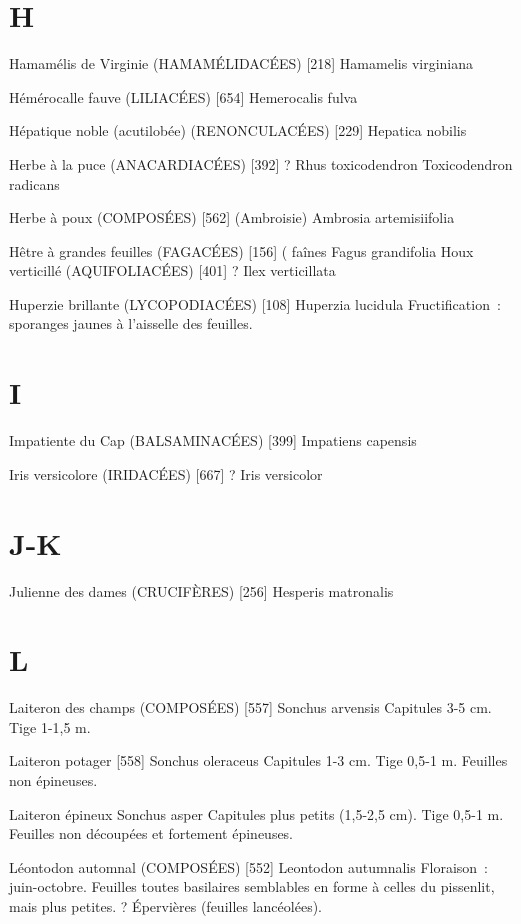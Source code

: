 \chapter*{H}

Hamamélis de Virginie (HAMAMÉLIDACÉES)  [218]
				Hamamelis virginiana

Hémérocalle fauve (LILIACÉES)  [654]
				Hemerocalis fulva

Hépatique noble (acutilobée) (RENONCULACÉES)  [229]
				Hepatica nobilis

Herbe à la puce (ANACARDIACÉES)  [392]			?
				Rhus toxicodendron
				Toxicodendron radicans

Herbe à poux (COMPOSÉES)  [562]  (Ambroisie)
				Ambrosia artemisiifolia

Hêtre à grandes feuilles (FAGACÉES)  [156]			( faînes
				Fagus grandifolia
Houx verticillé (AQUIFOLIACÉES)  [401]			?
				Ilex verticillata

Huperzie brillante (LYCOPODIACÉES)  [108]
				Huperzia lucidula
Fructification : sporanges jaunes à l’aisselle des feuilles.

\chapter*{I}

Impatiente du Cap (BALSAMINACÉES)  [399]
				Impatiens capensis

Iris versicolore (IRIDACÉES)  [667]				?
				Iris versicolor

\chapter*{J-K}

Julienne des dames (CRUCIFÈRES)  [256]
				Hesperis matronalis




\chapter*{L}

Laiteron des champs (COMPOSÉES)  [557]
				Sonchus arvensis
Capitules 3-5 cm. Tige 1-1,5 m.

Laiteron potager  [558]
				Sonchus oleraceus
Capitules 1-3 cm. Tige 0,5-1 m. Feuilles non épineuses.

Laiteron épineux
				Sonchus asper
Capitules plus petits (1,5-2,5 cm). Tige 0,5-1 m. Feuilles non découpées et fortement épineuses.

Léontodon automnal (COMPOSÉES)  [552]
				Leontodon autumnalis
Floraison : juin-octobre. Feuilles toutes basilaires semblables en forme à celles du pissenlit, mais plus petites. ? Épervières (feuilles lancéolées).

